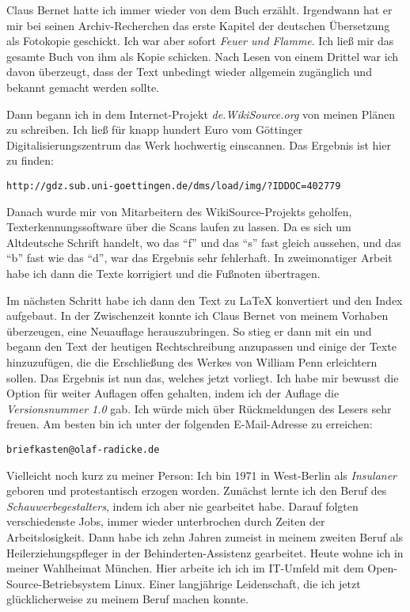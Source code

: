 \medskip

Claus Bernet hatte ich immer wieder von dem Buch erzählt. Irgendwann hat er mir
bei seinen Archiv-Recherchen das erste Kapitel der deutschen Übersetzung als
Fotokopie geschickt. Ich war aber sofort \textit{Feuer und
Flamme}. Ich ließ mir das gesamte Buch von ihm als Kopie schicken. Nach Lesen
von einem Drittel war
ich davon überzeugt, dass der Text unbedingt wieder allgemein zugänglich und
bekannt gemacht werden sollte.

\medskip

Dann begann ich in dem Internet-Projekt \textit{de.WikiSource.org} von meinen
Plänen
zu schreiben. Ich ließ für knapp hundert Euro vom Göttinger
Digitalisierungszentrum das Werk hochwertig einscannen. Das Ergebnis ist hier zu
finden:

\begin{center}
\texttt{http://gdz.sub.uni-goettingen.de/dms/load/img/?IDDOC=402779}
\end{center}

Danach wurde mir von Mitarbeitern des WikiSource-Projekts geholfen,
Texterkennungssoftware über die Scans laufen zu lassen. Da es sich um
Altdeutsche Schrift handelt, wo das "`f"' und das "`s"' fast gleich aussehen,
und das "`b"' fast wie das "`d"', war das Ergebnis sehr fehlerhaft. In
zweimonatiger Arbeit habe ich dann die Texte korrigiert und die Fußnoten
übertragen.

\medskip

Im nächsten Schritt habe ich dann den Text zu \LaTeX{} konvertiert und den Index
aufgebaut. In der Zwischenzeit konnte ich Claus Bernet von meinem Vorhaben
überzeugen, eine Neuauflage herauszubringen. So stieg er dann mit ein und begann
den Text der heutigen Rechtschreibung anzupassen und einige der Texte
hinzuzufügen, die die Erschließung des Werkes von William Penn erleichtern sollen.
Das Ergebnis ist nun das, welches jetzt vorliegt. Ich habe mir bewusst die
Option für weiter Auflagen offen gehalten, indem ich der Auflage die
\textit{Versionsnummer 1.0} gab. Ich würde mich über Rückmeldungen des Lesers
sehr freuen. Am besten bin ich unter der folgenden E-Mail-Adresse zu erreichen:

\begin{center}
\texttt{briefkasten@olaf-radicke.de}
\end{center}

Vielleicht noch kurz zu meiner Person: Ich bin 1971 in West-Berlin
als \textit{Insulaner} geboren und protestantisch erzogen worden. Zunächst lernte
ich den Beruf des \textit{Schauwerbegestalters}, indem ich aber nie gearbeitet
habe. Darauf folgten verschiedenste Jobs, immer wieder unterbrochen durch Zeiten
der Arbeitslosigkeit. Dann habe ich zehn Jahren zumeist in meinem zweiten Beruf 
als Heilerziehungspfleger in der Behinderten-Assistenz gearbeitet. Heute wohne ich 
in meiner Wahlheimat München. Hier arbeite ich ich im IT-Umfeld mit dem 
Open-Source-Betriebsystem Linux. Einer langjährige Leidenschaft, die ich jetzt 
glücklicherweise zu meinem Beruf machen konnte.

